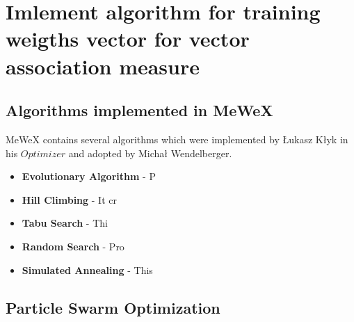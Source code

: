 \chapter{Imlement algorithm for training weigths vector for vector association measure}

\section{Algorithms implemented in MeWeX}
MeWeX contains several algorithms which were implemented by Łukasz Kłyk in his \(Optimizer\) and adopted by 
Michał Wendelberger.




\begin{itemize}
    \item \textbf{Evolutionary Algorithm} - P
 
    \item \textbf{Hill Climbing} - It cr
 
    \item \textbf{Tabu Search} - Thi
 
    \item \textbf{Random Search} - Pro
 
    \item \textbf{Simulated Annealing} - This   
\end{itemize}

\section{Particle Swarm Optimization}


